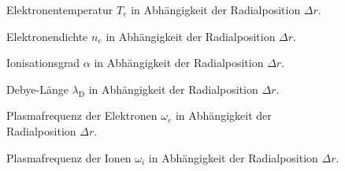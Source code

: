 \begin{figure}[htbp]
    \centering
    
    \caption{
        Elektronentemperatur $T_e$ in Abh\"angigkeit der Radialposition $\Delta r$.
    }
    \label{radial_Te}
\end{figure}
\begin{figure}[htbp]
    \centering
    
    \caption{
        Elektronendichte $n_e$ in Abh\"angigkeit der Radialposition $\Delta r$.
    }
    \label{radial_ne}
\end{figure}
\begin{figure}[htbp]
    \centering
    
    \caption{
        Ionisationsgrad $\alpha$ in Abh\"angigkeit der Radialposition $\Delta r$.
    }
    \label{radial_alpha}
\end{figure}
\begin{figure}[htbp]
    \centering
    
    \caption{
        Debye-L\"ange $\lambda_\text{D}$ in Abh\"angigkeit der Radialposition $\Delta r$.
    }
    \label{radial_deb}
\end{figure}
\begin{figure}[htbp]
    \centering
    
    \caption{
        Plasmafrequenz der Elektronen $\omega_e$ in Abh\"angigkeit der Radialposition $\Delta r$.
    }
    \label{radial_wpe}
\end{figure}
\begin{figure}[htbp]
    \centering
    
    \caption{
        Plasmafrequenz der Ionen $\omega_i$ in Abh\"angigkeit der Radialposition $\Delta r$.
    }
    \label{radial_wpi}
\end{figure}
